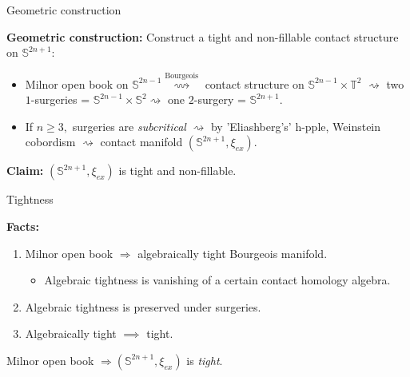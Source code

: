 \documentclass{beamer}
\begin{document}
\begin{frame}{Geometric construction}
    
    \textbf{Geometric construction:} Construct a tight and non-fillable contact structure on $\mathbb S^{2n+1}$:
    
    \medskip
    
    \pause

    \begin{itemize}
        \item Milnor open book on $\mathbb S^{2n-1}\overset{\text{Bourgeois}}{\rightsquigarrow}$ contact structure on $\mathbb S^{2n-1}\times \mathbb T^2$
    $\rightsquigarrow$ two $1$-surgeries = $\mathbb S^{2n-1}\times \mathbb S^2 \rightsquigarrow$ one $2$-surgery = $\mathbb S^{2n+1}.$

    \medskip

    \pause
    
    \item If $n\geq 3,$ surgeries are \emph{subcritical} $\rightsquigarrow$ by 'Eliashberg's' h-pple, Weinstein cobordism $\rightsquigarrow$ contact manifold $(\mathbb S^{2n+1},\xi_{ex})$.

    \end{itemize}

    \pause
    
    \medskip

    \begin{tcolorbox}
    \textbf{Claim:} $(\mathbb S^{2n+1},\xi_{ex})$ is tight and non-fillable.
    \end{tcolorbox}
    
\end{frame}

\begin{frame}{Tightness}

\textbf{Facts:} \begin{enumerate}
    \item Milnor open book $\Rightarrow$  algebraically tight Bourgeois manifold.
    \pause
    \begin{itemize}
        \item Algebraic tightness is vanishing of a certain contact homology algebra.
    \end{itemize}
    \pause
    \item Algebraic tightness is preserved under surgeries.
    \pause
    \item Algebraically tight $\implies$ tight.
\end{enumerate}

\pause

\vspace*{1cm}

\begin{tcolorbox}
    Milnor open book $\Rightarrow (\mathbb S^{2n+1},\xi_{ex})$ is \emph{tight}.
    \end{tcolorbox}

\end{frame}
\end{document}
